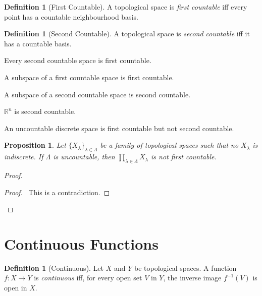 \documentclass{book}
\let\qed\relax
\newtheorem{prop}[ax]{Proposition}
\theoremstyle{definition}
\newtheorem{df}[ax]{Definition}
\newcommand{\inv}[1]{\ensuremath{{#1}^{-1}}}
\begin{document}
\begin{df}[First Countable]
A topological space is \emph{first countable} iff every point has a countable neighbourhood basis.
\end{df}

\begin{df}[Second Countable]
A topological space is \emph{second countable} iff it has a countable basis.
\end{df}

Every second countable space is first countable.

A subspace of a first countable space is first countable.

A subspace of a second countable space is second countable.

$\mathbb{R}^n$ is second countable.

An uncountable discrete space is first countable but not second countable.

\begin{prop}
Let $\{ X_\lambda \}_{\lambda \in \Lambda}$ be a family of topological spaces such that no $X_\lambda$ is indiscrete. If $\Lambda$ is uncountable, then $\prod_{\lambda \in \Lambda} X_\lambda$ is not first countable.
\end{prop}

\begin{proof}
\pf
{}
\qedstep
\begin{proof}
\pf\ This is a contradiction.
\end{proof}
\qed
\end{proof}

\section{Continuous Functions}

\begin{df}[Continuous]
Let $X$ and $Y$ be topological spaces. A function $f : X \rightarrow Y$ is \emph{continuous} iff, for every open set $V$ in $Y$, the inverse image $\inv{f}(V)$ is open in $X$.
\end{df}
\end{document}
